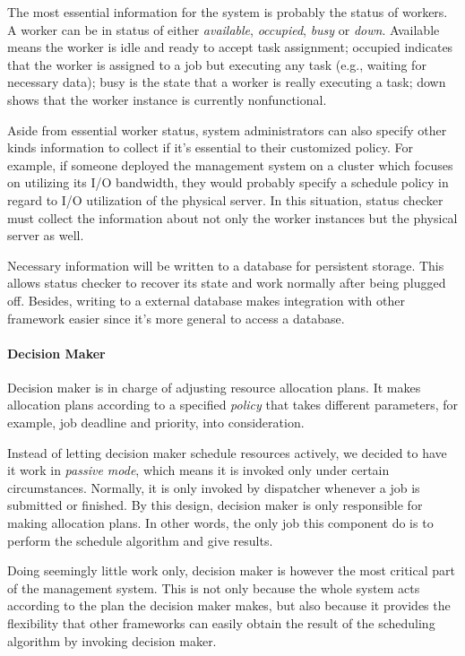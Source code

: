 The most essential information for the system is probably the status of
workers.
A worker can be in status of either \emph{available}, \emph{occupied},
\emph{busy} or \emph{down}.
Available means the worker
is idle and ready to accept task assignment; occupied indicates that the
worker is assigned to a job but executing any task (e.g., waiting for
necessary data); busy is the state that a worker is really executing a
task; down shows that the worker instance is currently nonfunctional. 

Aside from essential worker status, system administrators can also
specify other kinds information to collect if it's essential to  their
customized policy.
For example, if someone deployed the management system on a cluster
which focuses on utilizing its I/O bandwidth, they would probably
specify a schedule policy in regard to I/O utilization of the physical
server.
In this situation, status checker must collect the information about
not only the worker instances but the physical server as well.

Necessary information will be written to a database for persistent
storage.
This allows status checker to recover its state and work normally after
being plugged off.
Besides, writing to a external database makes integration with other
framework easier since it's more general to access a database.

\paragraph{Decision Maker}

Decision maker is in charge of adjusting resource allocation plans.
It
makes allocation plans according to a specified \emph{policy} that takes
different parameters, for example, job deadline and priority, into
consideration. 

Instead of letting decision maker schedule resources actively, we
decided to have it work in \emph{passive mode}, which means it is
invoked only under certain circumstances.
Normally, it is only invoked by dispatcher whenever a job is submitted
or finished.
By this design, decision maker is only responsible for making allocation
plans.
In other words, the only job this component do is to perform the
schedule algorithm and give results.


Doing seemingly little work only, decision maker is however the most
critical part of the management system.
This is not only because the whole system acts according to the plan the
decision maker makes, but also because it provides the flexibility that
other frameworks can easily obtain the result of the scheduling
algorithm by invoking decision maker.


